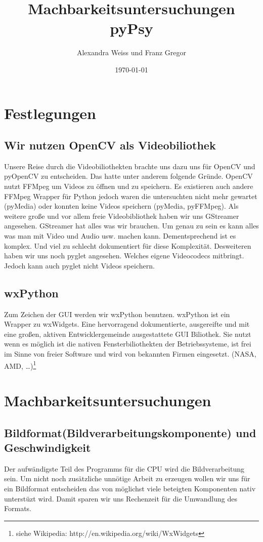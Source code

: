 \documentclass[a4paper,draft]{scrartcl}
\title{Machbarkeitsuntersuchungen pyPsy}
\author{Alexandra Weiss und Franz Gregor}
\date{\today}
\begin{document}
\maketitle
\newpage
\section{Festlegungen}
\subsection*{Wir nutzen OpenCV als Videobiliothek}
Unsere Reise durch die Videobiliothekten brachte uns dazu uns für OpenCV und pyOpenCV zu entscheiden. Das hatte unter anderem folgende Gründe. OpenCV nutzt FFMpeg um Videos zu öffnen und zu speichern. Es existieren auch andere FFMpeg Wrapper für Python jedoch waren die untersuchten nicht mehr gewartet (pyMedia) oder konnten keine Videos speichern (pyMedia, pyFFMpeg). Als weitere große und vor allem freie Videobibliothek haben wir uns GStreamer angesehen. GStreamer hat alles was wir brauchen. Um genau zu sein es kann alles was man mit Video und Audio usw. machen kann. Dementsprechend ist es komplex. Und viel zu schlecht dokumentiert für diese Komplexität. Desweiteren haben wir uns noch pyglet angesehen. Welches eigene Videocodecs mitbringt. Jedoch kann auch pyglet nicht Videos speichern.

\subsection*{wxPython}
Zum Zeichen der GUI werden wir wxPython benutzen. wxPython ist ein Wrapper zu wxWidgets. Eine hervorragend dokumentierte, ausgereifte und mit eine großen, aktiven Entwicklergemeinde ausgestattete GUI Biliothek. Sie nutzt wenn es möglich ist die nativen Fensterbiliothekten der Betriebssysteme, ist frei im Sinne von freier Software und wird von bekannten Firmen eingesetzt. (NASA, AMD, \dots)\footnote{siehe Wikipedia: http://en.wikipedia.org/wiki/WxWidgets}

\section{Machbarkeitsuntersuchungen}
\subsection*{Bildformat(Bildverarbeitungskomponente) und Geschwindigkeit }
Der aufwändigste Teil des Programms für die CPU wird die Bildverarbeitung sein. Um nicht noch zusätzliche unnötige Arbeit zu erzeugen wollen wir uns für ein Bildformat entscheiden das von möglichst viele beteigten Komponenten nativ unterstüzt wird. Damit sparen wir uns Rechenzeit für die Umwandlung des Formats.
\end{document}
